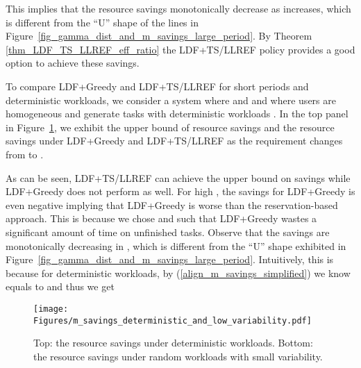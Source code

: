 \documentclass[prodmode,acmtompecs]{acmsmall}
\newcommand{\myComments}[1]{}
\newcommand{\commentEnd}{\myComments{End}}
\begin{document}
This implies that the resource savings monotonically decrease as  increases, which is different from the ``U'' shape of the lines in Figure~{\ref{fig_gamma_dist_and_m_savings_large_period}}. By Theorem \ref{thm_LDF_TS_LLREF_eff_ratio} the LDF+TS/LLREF policy provides a good option to achieve these savings. 
\commentEnd\fi

To compare LDF+Greedy and LDF+TS/LLREF for short periods  and deterministic workloads, we consider a system where  and  and where users are homogeneous and generate tasks with deterministic workloads . 
In the top panel in Figure~{\ref{fig_m_savings_deterministic_and_low_variability}}, we exhibit the upper bound of resource savings and the resource savings under LDF+Greedy and LDF+TS/LLREF as the requirement  changes from  to . 

As can be seen, LDF+TS/LLREF can achieve the upper bound on savings while LDF+Greedy does not perform as well. 
For high , the savings for LDF+Greedy is even negative implying that LDF+Greedy is worse than the reservation-based approach. 
This is because we chose  and  such that LDF+Greedy wastes a significant amount of time on unfinished tasks. 
Observe that the savings are monotonically decreasing in , which is different from the ``U'' shape exhibited in Figure~{\ref{fig_gamma_dist_and_m_savings_large_period}}. Intuitively, this is because for deterministic workloads, by (\ref{align_m_savings_simplified}) we know  equals to  and thus we get


\begin{figure}[htp]
  \centering
  \texttt{[image: Figures/m\_savings\_deterministic\_and\_low\_variability.pdf]}
  \caption{Top: the resource savings under deterministic workloads. Bottom: the resource savings under random workloads with small variability. }
  \label{fig_m_savings_deterministic_and_low_variability}
\end{figure}
\end{document}
